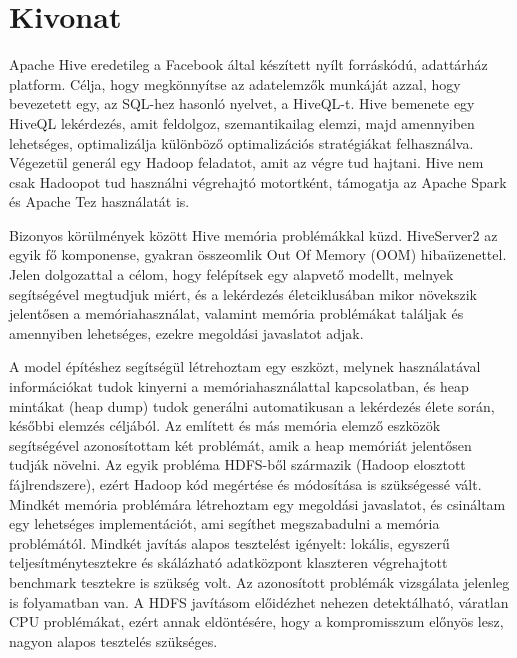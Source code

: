 \setcounter{page}{1}

\selecthungarian

\chapter*{Kivonat}

Apache Hive eredetileg a Facebook által készített nyílt forráskódú, adattárház platform. Célja, hogy megkönnyítse az adatelemzők munkáját azzal, hogy bevezetett egy, az SQL-hez hasonló nyelvet, a HiveQL-t. Hive bemenete egy HiveQL lekérdezés, amit feldolgoz, szemantikailag elemzi, majd amennyiben lehetséges, optimalizálja különböző optimalizációs stratégiákat felhasználva. Végezetül generál egy Hadoop feladatot, amit az végre tud hajtani. Hive nem csak Hadoopot tud használni végrehajtó motortként, támogatja az Apache Spark és Apache Tez használatát is. 

Bizonyos körülmények között Hive memória problémákkal küzd. HiveServer2 az egyik fő komponense, gyakran összeomlik Out Of Memory (OOM) hibaüzenettel. Jelen dolgozattal a célom, hogy felépítsek egy alapvető modellt, melnyek segítségével megtudjuk miért, és a lekérdezés életciklusában mikor növekszik jelentősen a memóriahasználat, valamint memória problémákat találjak és amennyiben lehetséges, ezekre megoldási javaslatot adjak.

A model építéshez segítségül létrehoztam egy eszközt, melynek használatával információkat tudok kinyerni a memóriahasználattal kapcsolatban, és heap mintákat (heap dump) tudok generálni automatikusan a lekérdezés élete során, későbbi elemzés céljából. Az említett és más memória elemző eszközök segítségével azonosítottam két problémát, amik a heap memóriát jelentősen tudják növelni. Az egyik probléma HDFS-ből származik (Hadoop elosztott fájlrendszere), ezért Hadoop kód megértése és módosítása is szükségessé vált. Mindkét memória problémára létrehoztam egy megoldási javaslatot, és csináltam egy lehetséges implementációt, ami segíthet megszabadulni a memória problémától. Mindkét javítás alapos tesztelést igényelt: lokális, egyszerű teljesítménytesztekre és skálázható adatközpont klaszteren végrehajtott benchmark tesztekre is szükség volt. Az azonosított problémák vizsgálata jelenleg is folyamatban van. A HDFS javításom előidézhet nehezen detektálható, váratlan CPU problémákat, ezért annak eldöntésére, hogy a kompromisszum előnyös lesz, nagyon alapos tesztelés szükséges.


